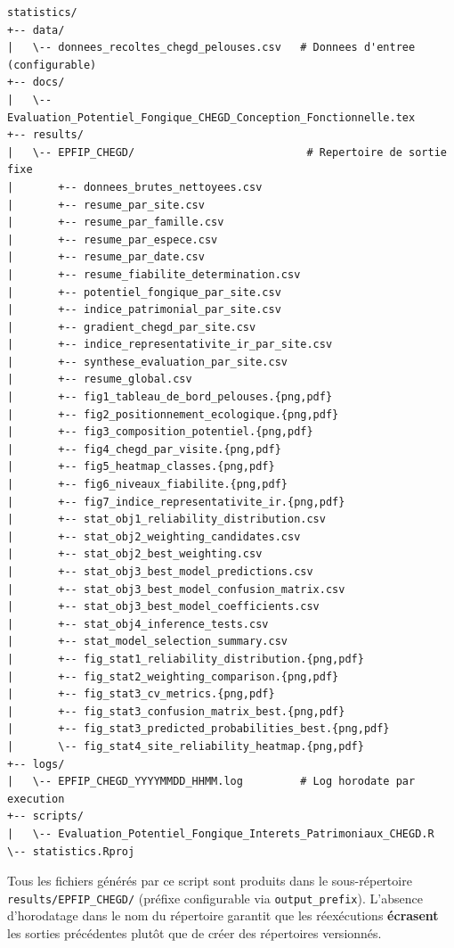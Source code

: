 \documentclass[11pt,a4paper]{article}
\begin{document}
\begin{Verbatim}[fontsize=\small, frame=single, rulecolor=\color{midblue}]
statistics/
+-- data/
|   \-- donnees_recoltes_chegd_pelouses.csv   # Donnees d'entree (configurable)
+-- docs/
|   \-- Evaluation_Potentiel_Fongique_CHEGD_Conception_Fonctionnelle.tex
+-- results/
|   \-- EPFIP_CHEGD/                           # Repertoire de sortie fixe
|       +-- donnees_brutes_nettoyees.csv
|       +-- resume_par_site.csv
|       +-- resume_par_famille.csv
|       +-- resume_par_espece.csv
|       +-- resume_par_date.csv
|       +-- resume_fiabilite_determination.csv
|       +-- potentiel_fongique_par_site.csv
|       +-- indice_patrimonial_par_site.csv
|       +-- gradient_chegd_par_site.csv
|       +-- indice_representativite_ir_par_site.csv
|       +-- synthese_evaluation_par_site.csv
|       +-- resume_global.csv
|       +-- fig1_tableau_de_bord_pelouses.{png,pdf}
|       +-- fig2_positionnement_ecologique.{png,pdf}
|       +-- fig3_composition_potentiel.{png,pdf}
|       +-- fig4_chegd_par_visite.{png,pdf}
|       +-- fig5_heatmap_classes.{png,pdf}
|       +-- fig6_niveaux_fiabilite.{png,pdf}
|       +-- fig7_indice_representativite_ir.{png,pdf}
|       +-- stat_obj1_reliability_distribution.csv
|       +-- stat_obj2_weighting_candidates.csv
|       +-- stat_obj2_best_weighting.csv
|       +-- stat_obj3_best_model_predictions.csv
|       +-- stat_obj3_best_model_confusion_matrix.csv
|       +-- stat_obj3_best_model_coefficients.csv
|       +-- stat_obj4_inference_tests.csv
|       +-- stat_model_selection_summary.csv
|       +-- fig_stat1_reliability_distribution.{png,pdf}
|       +-- fig_stat2_weighting_comparison.{png,pdf}
|       +-- fig_stat3_cv_metrics.{png,pdf}
|       +-- fig_stat3_confusion_matrix_best.{png,pdf}
|       +-- fig_stat3_predicted_probabilities_best.{png,pdf}
|       \-- fig_stat4_site_reliability_heatmap.{png,pdf}
+-- logs/
|   \-- EPFIP_CHEGD_YYYYMMDD_HHMM.log         # Log horodate par execution
+-- scripts/
|   \-- Evaluation_Potentiel_Fongique_Interets_Patrimoniaux_CHEGD.R
\-- statistics.Rproj
\end{Verbatim}

\begin{infobox}
  Tous les fichiers générés par ce script sont produits dans le sous-répertoire
  \texttt{results/EPFIP\_CHEGD/} (préfixe configurable via \texttt{output\_prefix}).
  L'absence d'horodatage dans le nom du répertoire garantit que les réexécutions
  \textbf{écrasent} les sorties précédentes plutôt que de créer des répertoires versionnés.
\end{infobox}
\end{document}
